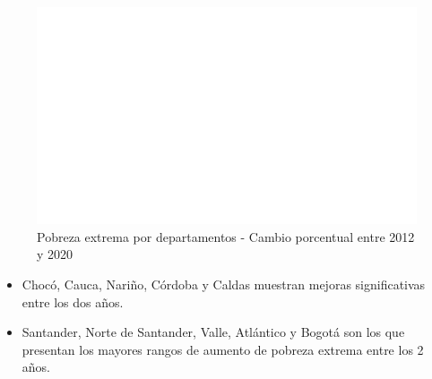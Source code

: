     \begin{figure}[H]
        \caption{Pobreza extrema por departamentos - Cambio porcentual entre 2012 y 2020 \label{map_result_2} }
        \begin{center}
        \includegraphics[width=\textwidth,keepaspectratio]{img/var_258_map_change.png}
        \end{center}
    \end{figure}
            \begin{itemize}
                    \item Chocó, Cauca, Nariño, Córdoba y Caldas muestran mejoras significativas entre los dos años.
                    \item Santander, Norte de Santander, Valle, Atlántico y Bogotá son los que presentan los mayores rangos de aumento de pobreza extrema entre los 2 años.
                    \end{itemize}

